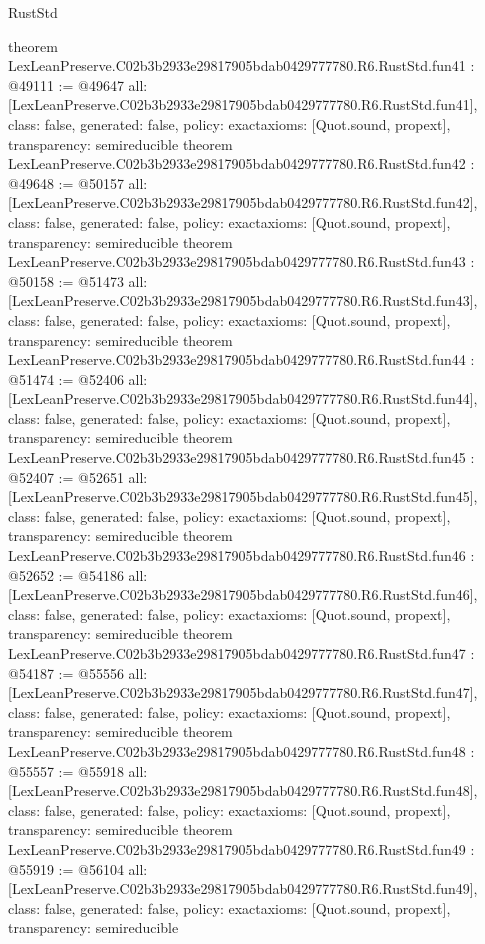 \begin{lexlean}{RustStd}
\begin{coremodule}
{}
theorem LexLeanPreserve.C02b3b2933e29817905bdab0429777780.R6.RustStd.fun41 : @49111 := @49647 {
  all: [LexLeanPreserve.C02b3b2933e29817905bdab0429777780.R6.RustStd.fun41],
  class: false,
  generated: false,
  policy: exact{axioms: [Quot.sound, propext]},
  transparency: semireducible
}
theorem LexLeanPreserve.C02b3b2933e29817905bdab0429777780.R6.RustStd.fun42 : @49648 := @50157 {
  all: [LexLeanPreserve.C02b3b2933e29817905bdab0429777780.R6.RustStd.fun42],
  class: false,
  generated: false,
  policy: exact{axioms: [Quot.sound, propext]},
  transparency: semireducible
}
theorem LexLeanPreserve.C02b3b2933e29817905bdab0429777780.R6.RustStd.fun43 : @50158 := @51473 {
  all: [LexLeanPreserve.C02b3b2933e29817905bdab0429777780.R6.RustStd.fun43],
  class: false,
  generated: false,
  policy: exact{axioms: [Quot.sound, propext]},
  transparency: semireducible
}
theorem LexLeanPreserve.C02b3b2933e29817905bdab0429777780.R6.RustStd.fun44 : @51474 := @52406 {
  all: [LexLeanPreserve.C02b3b2933e29817905bdab0429777780.R6.RustStd.fun44],
  class: false,
  generated: false,
  policy: exact{axioms: [Quot.sound, propext]},
  transparency: semireducible
}
theorem LexLeanPreserve.C02b3b2933e29817905bdab0429777780.R6.RustStd.fun45 : @52407 := @52651 {
  all: [LexLeanPreserve.C02b3b2933e29817905bdab0429777780.R6.RustStd.fun45],
  class: false,
  generated: false,
  policy: exact{axioms: [Quot.sound, propext]},
  transparency: semireducible
}
theorem LexLeanPreserve.C02b3b2933e29817905bdab0429777780.R6.RustStd.fun46 : @52652 := @54186 {
  all: [LexLeanPreserve.C02b3b2933e29817905bdab0429777780.R6.RustStd.fun46],
  class: false,
  generated: false,
  policy: exact{axioms: [Quot.sound, propext]},
  transparency: semireducible
}
theorem LexLeanPreserve.C02b3b2933e29817905bdab0429777780.R6.RustStd.fun47 : @54187 := @55556 {
  all: [LexLeanPreserve.C02b3b2933e29817905bdab0429777780.R6.RustStd.fun47],
  class: false,
  generated: false,
  policy: exact{axioms: [Quot.sound, propext]},
  transparency: semireducible
}
theorem LexLeanPreserve.C02b3b2933e29817905bdab0429777780.R6.RustStd.fun48 : @55557 := @55918 {
  all: [LexLeanPreserve.C02b3b2933e29817905bdab0429777780.R6.RustStd.fun48],
  class: false,
  generated: false,
  policy: exact{axioms: [Quot.sound, propext]},
  transparency: semireducible
}
theorem LexLeanPreserve.C02b3b2933e29817905bdab0429777780.R6.RustStd.fun49 : @55919 := @56104 {
  all: [LexLeanPreserve.C02b3b2933e29817905bdab0429777780.R6.RustStd.fun49],
  class: false,
  generated: false,
  policy: exact{axioms: [Quot.sound, propext]},
  transparency: semireducible
}
\end{coremodule}
\end{lexlean}
